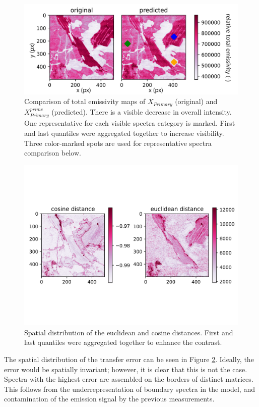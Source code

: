 \documentclass[preprint,11pt]{elsarticle}
\begin{document}
\begin{figure}[!htb]
    \centering
    \includegraphics[width=\textwidth]{predicted_vs_original_map.png}
    \caption{Comparison of total emissivity maps of $X_{Primary}$ (original) and $X_{Primary}^{prime}$ (predicted). There is a visible decrease in overall intensity. One representative for each visible spectra category is marked. First and last quantiles were aggregated together to increase visibility. Three color-marked spots are used for representative spectra comparison below.}
    \label{fig:emissivity}
\end{figure}

\begin{figure}[!htb]
    \centering
    \includegraphics[height=0.5\textheight]{error_maps.png}
    \caption{Spatial distribution of the euclidean and cosine distances. First and last quantiles were aggregated together to enhance the contrast.}
    \label{fig:error_maps}
\end{figure}

The spatial distribution of the transfer error can be seen in Figure \ref{fig:error_maps}. Ideally, the error would be spatially invariant; however, it is clear that this is not the case. Spectra with the highest error are assembled on the borders of distinct matrices. This follows from the underrepresentation of boundary spectra in the model, and contamination of the emission signal by the previous measurements.
\end{document}
